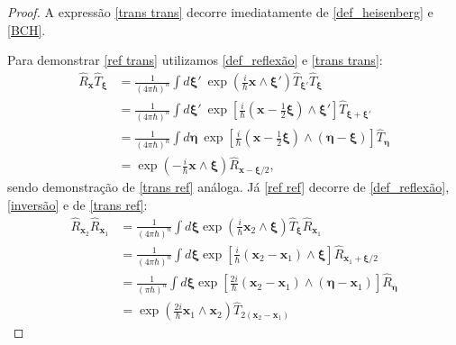 \documentclass[
	12pt,
	oneside,			%
	a4paper,			%
	english,			%
	brazil				%
	]{abntex2}
\theoremstyle{definition}
\begin{document}
\begin{proof}

    A expressão \eqref{trans trans} decorre imediatamente de \eqref{def_heisenberg} e \eqref{BCH}.

    Para demonstrar \eqref{ref trans} utilizamos \eqref{def_reflexão} e \eqref{trans trans}:
    \begin{equation}
        \begin{aligned}
            \hat{R}_\mathbf{x} \hat{T}_{\boldsymbol{\xi}} &= \frac{1}{\left(4\pi \hbar\right)^n} \int d \boldsymbol{\xi}' \ \exp \left(\frac{i}{\hbar}\mathbf{x} \wedge \boldsymbol{\xi} '\right) \hat{T}_{\boldsymbol{\xi}'} \hat{T}_{\boldsymbol{\xi}} \\
            &= \frac{1}{\left(4\pi \hbar\right)^n} \int d \boldsymbol{\xi}' \ \exp \left[\frac{i}{\hbar}\left(\mathbf{x} - \frac{1}{2}\boldsymbol{\xi}\right) \wedge \boldsymbol{\xi} '\right] \hat{T}_{\boldsymbol{\xi}+\boldsymbol{\xi}'} \\
            &= \frac{1}{\left(4\pi \hbar\right)^n} \int d \boldsymbol{\eta} \ \exp \left[\frac{i}{\hbar}\left(\mathbf{x} - \frac{1}{2}\boldsymbol{\xi}\right) \wedge \left(\boldsymbol{\eta} - \boldsymbol{\xi} \right)\right] \hat{T}_{\boldsymbol{\eta}} \\ &= \exp \left( -\frac{i}{\hbar} \mathbf{x} \wedge \boldsymbol{\xi}\right) \hat{R}_{\mathbf{x}-\boldsymbol{\xi}/2},
        \end{aligned}
    \end{equation}
    sendo demonstração de \eqref{trans ref} análoga.
    Já \eqref{ref ref} decorre de \eqref{def_reflexão}, \eqref{inversão} e de \eqref{trans ref}:
    \begin{equation}
        \begin{aligned}
            \hat{R}_{\mathbf{x}_2} \hat{R}_{\mathbf{x}_1} &= \frac{1}{\left(4\pi \hbar\right)^n} \int d \boldsymbol{\xi} \exp\left(\frac{i}{\hbar}\mathbf{x}_2 \wedge \boldsymbol{\xi}\right) \hat{T}_{\boldsymbol{\xi}} \hat{R}_{\mathbf{x}_1} \\
            &= \frac{1}{\left(4\pi \hbar\right)^n} \int d \boldsymbol{\xi} \exp\left[\frac{i}{\hbar}\left(\mathbf{x}_2-\mathbf{x}_1\right) \wedge \boldsymbol{\xi}\right] \hat{R}_{\mathbf{x}_1+\boldsymbol{\xi}/2} \\
            &= \frac{1}{\left(\pi \hbar\right)^n} \int d \boldsymbol{\xi} \exp\left[\frac{2i}{\hbar}\left(\mathbf{x}_2-\mathbf{x}_1\right) \wedge \left(\boldsymbol{\eta}-\mathbf{x}_1\right)\right] \hat{R}_{\boldsymbol{\eta}} \\ &= \exp \left( \frac{2i}{\hbar} \mathbf{x}_1 \wedge \mathbf{x}_2 \right) \hat{T}_{2(\mathbf{x}_2-\mathbf{x}_1)}
        \end{aligned}
    \end{equation}
\end{proof}
\end{document}
